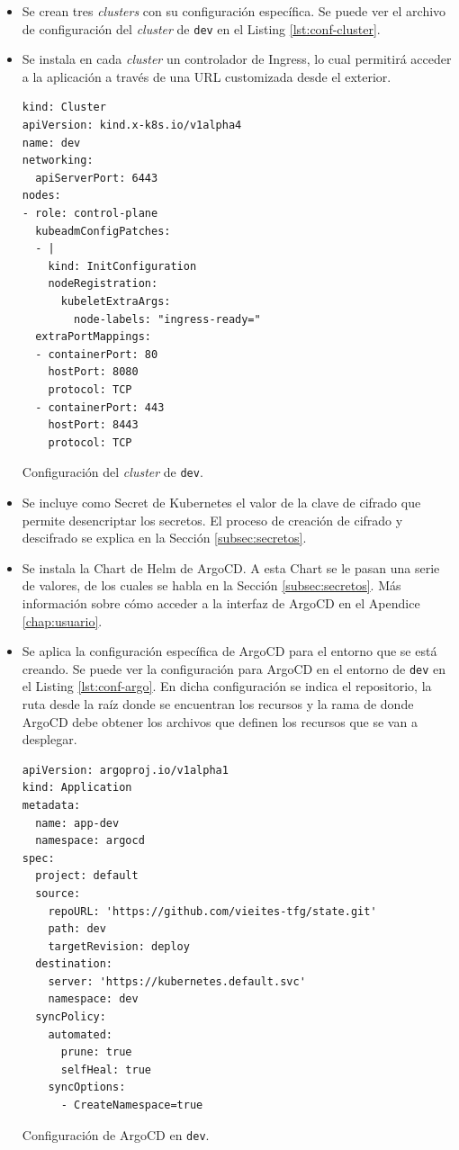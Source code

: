 \begin{itemize}
  \item Se crean tres \textit{clusters} con su configuración específica. Se puede ver el archivo de configuración del \textit{cluster} de \texttt{dev} en el Listing \ref{lst:conf-cluster}.
  \item Se instala en cada \textit{cluster} un controlador de Ingress, lo cual permitirá acceder a la aplicación a través de una URL customizada desde el exterior.

\begin{listing}[!ht]
  \begin{verbatim}
kind: Cluster
apiVersion: kind.x-k8s.io/v1alpha4
name: dev
networking:
  apiServerPort: 6443
nodes:
- role: control-plane
  kubeadmConfigPatches:
  - |
    kind: InitConfiguration
    nodeRegistration:
      kubeletExtraArgs:
        node-labels: "ingress-ready="
  extraPortMappings:
  - containerPort: 80
    hostPort: 8080
    protocol: TCP
  - containerPort: 443
    hostPort: 8443
    protocol: TCP
  \end{verbatim}
  \caption{Configuración del \textit{cluster} de \texttt{dev}.}
  \label{lst:conf-cluster}
\end{listing}

  \item Se incluye como Secret de Kubernetes el valor de la clave de cifrado que permite desencriptar los secretos. El proceso de creación de cifrado y descifrado se explica en la Sección \ref{subsec:secretos}.
  \item Se instala la Chart de Helm de ArgoCD. A esta Chart se le pasan una serie de valores, de los cuales se habla en la Sección \ref{subsec:secretos}. Más información sobre cómo acceder a la interfaz de ArgoCD en el Apendice \ref{chap:usuario}.
  \item Se aplica la configuración específica de ArgoCD para el entorno que se está creando. Se puede ver la configuración para ArgoCD en el entorno de \texttt{dev} en el Listing \ref{lst:conf-argo}. En dicha configuración se indica el repositorio, la ruta desde la raíz donde se encuentran los recursos y la rama de donde ArgoCD debe obtener los archivos que definen los recursos que se van a desplegar.

\begin{listing}[!ht]
  \begin{verbatim}
apiVersion: argoproj.io/v1alpha1
kind: Application
metadata:
  name: app-dev
  namespace: argocd
spec:
  project: default
  source:
    repoURL: 'https://github.com/vieites-tfg/state.git'
    path: dev
    targetRevision: deploy
  destination:
    server: 'https://kubernetes.default.svc'
    namespace: dev
  syncPolicy:
    automated:
      prune: true
      selfHeal: true
    syncOptions:
      - CreateNamespace=true
    \end{verbatim}
    \caption{Configuración de ArgoCD en \texttt{dev}.}
    \label{lst:conf-argo}
\end{listing}


\end{itemize}

